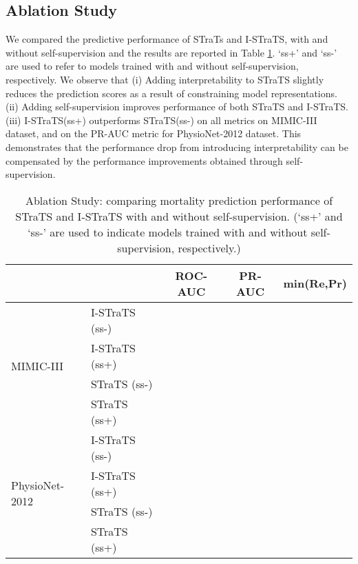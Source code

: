 \subsection{Ablation Study}
We compared the predictive performance of STraTs and I-STraTS, with and without self-supervision and the results are reported in Table \ref{tab:ablation}. `ss+' and `ss-' are used to refer to models trained with and without self-supervision, respectively. We observe that (i) Adding interpretability to STraTS slightly reduces the prediction scores as a result of constraining model representations. (ii) Adding self-supervision improves performance of both STraTS and I-STraTS. (iii) I-STraTS(ss+) outperforms STraTS(ss-) on all metrics on MIMIC-III dataset, and on the PR-AUC metric for PhysioNet-2012 dataset. This demonstrates that the performance drop from introducing interpretability can be compensated by the performance improvements obtained through self-supervision. 
\begin{table}[]
\centering
    \caption{Ablation Study: comparing mortality prediction performance of STraTS and I-STraTS with and without self-supervision. (`ss+' and `ss-' are used to indicate models trained with and without self-supervision, respectively.)}
    \label{tab:ablation}
    \begin{tabular}{llccc}
    \toprule
    & &ROC-AUC &PR-AUC &min(Re,Pr) \\
    \midrule
    \multirow{4}{*}{MIMIC-III}
    &I-STraTS (ss-) &&&\\    
    &I-STraTS (ss+) &&&\\
    &STraTS (ss-)      &&&\\ 
    &STraTS (ss+) &&&\\
    \hline
    \multirow{4}{*}{PhysioNet-2012}
    &I-STraTS (ss-) &&&\\
    &I-STraTS (ss+) &&&\\
    &STraTS (ss-)  &&&\\
    &STraTS (ss+)  &&&\\
    \bottomrule
    \end{tabular}
\end{table}

